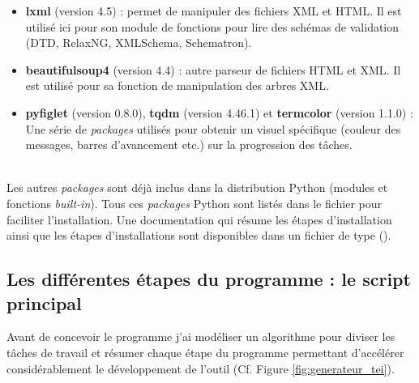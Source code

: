 \begin{itemize}
    \item \textbf{lxml} (version 4.5) : permet de manipuler des fichiers XML et HTML. Il est utilisé ici pour son module de fonctions pour lire des schémas de validation (DTD, RelaxNG, XMLSchema, Schematron).
    \item \textbf{beautifulsoup4} (version 4.4) : autre parseur de fichiers HTML et XML. Il est utilisé pour sa fonction de manipulation des arbres XML.
    \item \textbf{pyfiglet} (version 0.8.0), \textbf{tqdm} (version 4.46.1) et \textbf{termcolor} (version 1.1.0) : Une série de \textit{packages} utilisés pour obtenir un visuel spécifique (couleur des messages, barres d'avancement etc.) sur la progression des tâches.
\end{itemize}\\

Les autres \textit{packages} sont déjà inclus dans la distribution Python (modules et fonctions \textit{built-in}). Tous ces \textit{packages} Python sont listés dans le fichier  pour faciliter l'installation. Une documentation qui résume les étapes d'installation ainsi que les étapes d'installations sont disponibles dans un fichier de type  ().\\

\subsection{Les différentes étapes du programme : le script principal }

Avant de concevoir le programme j'ai modéliser un algorithme pour diviser les tâches de travail et résumer chaque étape du programme permettant d'accélérer considérablement le développement de l'outil (Cf. Figure \ref{fig:generateur_tei}).\\

